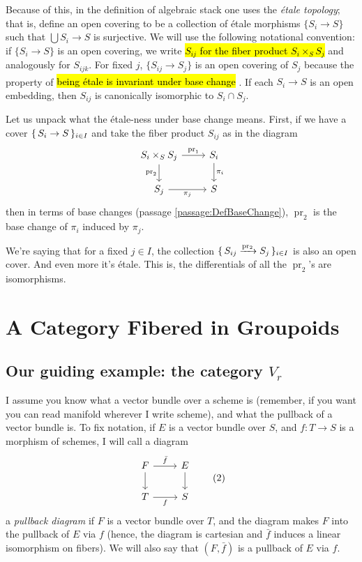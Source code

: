 \documentclass[12pt]{memoir}
\makeatletter
\newcommand{\roundedhighlight}[1]{%
  \begingroup
  \setuloverlap{2pt}%
  \def\SOUL@ulunderline##1{{%
    \setbox\z@\hbox{##1}%
    \rlap{\SOUL@ulcolor{\tikz[overlay,blend mode=darken]{%
      \fill[rounded corners=2pt]
        (-\SOUL@uloverlap,-\SOUL@uldp)
        rectangle (\dimexpr\wd\z@+\SOUL@uloverlap\relax,\SOUL@ulht);%
    }}}%
    \unhcopy\z@
  }}%
  \hl{#1}%
  \endgroup
}
\DeclareRobustCommand{\hlblue}[1]{{\sethlcolor{noteblue}\roundedhighlight{#1}}}
\DeclareRobustCommand{\hlgreen}[1]{{\sethlcolor{notegreen}\roundedhighlight{#1}}}
\newcounter{passage}
\newcommand{\passagemark}{%
  \refstepcounter{passage}%
  \textsuperscript{\normalfont[\thepassage]}%
}
\makeatother
\begin{document}
Because of this, in the definition of algebraic stack one uses the \emph{\'etale topology}; that is, define an open covering to be a collection of \'etale morphisms $\{S_i \to S\}$ such that $\bigcup S_i \to S$ is surjective. We will use the following notational convention: if $\{S_i \to S\}$ is an open covering, we write \hlgreen{$S_{ij}$ for the fiber product $S_i \times_S S_j$} and analogously for $S_{ijk}$. For fixed $j$, $\{S_{ij} \to S_j\}$ is an open covering of $S_j$ because the property of \hlblue{being \'etale is invariant under base change}\passagemark\label{passage:ÉtaleInvarianceBaseChange}. If each $S_i \to S$ is an open embedding, then $S_{ij}$ is canonically isomorphic to $S_i \cap S_j$.

\begin{ptcb}
    Let us unpack what the étale-ness under base change means. First, if we have a cover \(\{\,S_i\to S\,\}_{i\in I}\) and take the fiber product \(S_{ij}\) as in the diagram
    \[
    \begin{tikzcd}
S_i\x_SS_j \arrow[d, "\text{pr}_2"'] \arrow[r, "\operatorname{pr}_1"] & S_i \arrow[d, "\pi_i"] \\
S_j \arrow[r, "\pi_j"']                                               & S                     
\end{tikzcd}
    \]
    then in terms of base changes (passage \ref{passage:DefBaseChange}), \(\operatorname{pr}_2\) is the base change of \(\pi_i\) induced by \(\pi_j\).\par
    We're saying that for a fixed \(j\in I\), the collection \(\{\,S_{ij}\xrightarrow{\operatorname{pr_2}}S_j\,\}_{i\in I}\) is also an open cover. And even more it's étale. This is, the differentials of all the \(\operatorname{pr}_2\)'s are isomorphisms.
\end{ptcb}
\section{A Category Fibered in Groupoids}

\subsection{Our guiding example: the category $V_r$}

I assume you know what a vector bundle over a scheme is (remember, if you want you can read manifold wherever I write scheme), and what the pullback of a vector bundle is. To fix notation, if $E$ is a vector bundle over $S$, and $f\colon T \to S$ is a morphism of schemes, I will call a diagram
\begin{equation}
\begin{tikzcd}
F \arrow[r, "\bar{f}"] \arrow[d] & E \arrow[d] \\
T \arrow[r, "f"'] & S
\end{tikzcd}
\tag{2}\label{eq:vector-bundle-pullback}
\end{equation}
a \emph{pullback diagram} if $F$ is a vector bundle over $T$, and the diagram makes $F$ into the pullback of $E$ via $f$ (hence, the diagram is cartesian and $\bar{f}$ induces a linear isomorphism on fibers). We will also say that $(F, \bar{f})$ is a pullback of $E$ via $f$.
\end{document}
